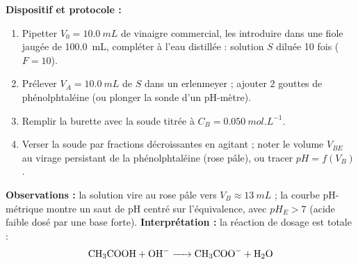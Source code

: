 \documentclass[11pt]{article}
\begin{document}
\begin{experience}
\textbf{Dispositif et protocole :}
\begin{enumerate}
\item Pipetter $V_0 = \SI{10,0}{mL}$ de vinaigre commercial, les introduire dans une fiole jaugée de \SI{100,0}{mL}, compléter à l'eau distillée : solution $S$ diluée 10 fois ($F = 10$).
\item Prélever $V_A = \SI{10,0}{mL}$ de $S$ dans un erlenmeyer ; ajouter 2 gouttes de phénolphtaléine (ou plonger la sonde d'un pH-mètre).
\item Remplir la burette avec la soude titrée à $C_B = \SI{0,050}{mol.L^{-1}}$.
\item Verser la soude par fractions décroissantes en agitant ; noter le volume $V_{BE}$ au virage persistant de la phénolphtaléine (rose pâle), ou tracer $pH = f(V_B)$.
\end{enumerate}
\textbf{Observations :} la solution vire au rose pâle vers $V_B \approx \SI{13}{mL}$ ; la courbe pH-métrique montre un saut de pH centré sur l'équivalence, avec $pH_E > 7$ (acide faible dosé par une base forte).
\textbf{Interprétation :} la réaction de dosage est totale :
\[ \ce{CH3COOH + OH- -> CH3COO- + H2O} \]
\end{experience}
\end{document}

